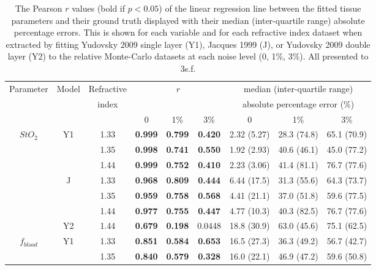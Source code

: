 \begin{table}[htb!]
    \centering
    \caption{The Pearson $r$ values (bold if $p<0.05$) of the linear regression line between the fitted tissue parameters and their ground truth displayed with their median (inter-quartile range) absolute percentage errors. This is shown for each variable and for each refractive index dataset when extracted by fitting Yudovsky 2009 single layer (Y1), Jacques 1999 (J), or Yudovsky 2009 double layer (Y2) to the relative Monte-Carlo datasets at each noise level (0, 1\%, 3\%). All presented to 3s.f.}
    \begin{tabular}{|ccc|ccc|ccc|}
        \hline
        Parameter & Model & Refractive & \multicolumn{3}{c}{$r$} & \multicolumn{3}{|c|}{median (inter-quartile range)} \\
        & & index & \multicolumn{3}{c}{} & \multicolumn{3}{|c|}{absolute percentage error (\%)} \\
        & & & 0 & 1\% & 3\% & 0 & 1\% & 3\% \\
        \hline
        \multirow{7}{*}{$StO_2$} & \multirow{3}{*}{Y1} & 1.33 & \textbf{0.999} & \textbf{0.799} & \textbf{0.420} & 2.32 (5.27) & 28.3 (74.8) & 65.1 (70.9) \\
        & & 1.35 & \textbf{0.998} & \textbf{0.741} & \textbf{0.550} & 1.92 (2.93) & 40.6 (46.1) & 45.0 (77.2) \\
        & & 1.44 & \textbf{0.999} & \textbf{0.752} & \textbf{0.410} & 2.23 (3.06) & 41.4 (81.1) & 76.7 (77.6) \\
        \cline{2-9}
        & \multirow{3}{*}{J} & 1.33 & \textbf{0.968} & \textbf{0.809} & \textbf{0.444} & 6.44 (17.5) & 31.3 (55.6) & 64.3 (73.7) \\
        & & 1.35 & \textbf{0.959} & \textbf{0.758} & \textbf{0.568} & 4.41 (21.1) & 37.0 (51.8) & 59.6 (77.5) \\
        & & 1.44 &  \textbf{0.977} & \textbf{0.755} & \textbf{0.447} & 4.77 (10.3) & 40.3 (82.5) & 76.7 (77.6) \\
        \cline{2-9}
        & Y2 & 1.44 & \textbf{0.679} & \textbf{0.198} & 0.0448 & 18.8 (30.9) & 63.0 (45.6) & 75.1 (62.5) \\
        \hline
        \multirow{7}{*}{$f_{blood}$} & \multirow{3}{*}{Y1} & 1.33 & \textbf{0.851} & \textbf{0.584} & \textbf{0.653} & 16.5 (27.3) & 36.3 (49.2) & 56.7 (42.7) \\
        & & 1.35 & \textbf{0.840} & \textbf{0.579} & \textbf{0.328} & 16.0 (22.1) & 46.9 (47.2) & 59.6 (50.8) \\

\end{tabular}
\end{table}
